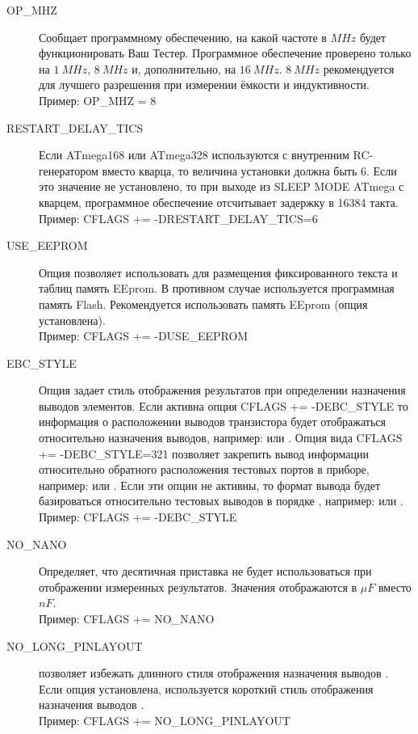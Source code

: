 \begin{description}
  \item[OP\_MHZ] Сообщает программному обеспечению, на какой частоте в \(MHz\) будет функционировать Ваш Тестер. 
Программное обеспечение проверено только на \(1~MHz\), \(8~MHz\) и, дополнительно, на \(16~MHz\). \(8~MHz\) 
рекомендуется для лучшего разрешения при измерении ёмкости и индуктивности.\\
Пример: OP\_MHZ = 8

  \item[RESTART\_DELAY\_TICS] Если ATmega168 или ATmega328 используются с внутренним RC-генератором вместо кварца, 
то величина установки должна быть 6. Если это значение не установлено, то при выходе из SLEEP MODE ATmega с 
кварцем, программное обеспечение отсчитывает задержку в 16384 такта.\\
Пример: CFLAGS += -DRESTART\_DELAY\_TICS=6

  \item[USE\_EEPROM] Опция позволяет использовать для размещения фиксированного текста и таблиц память EEprom. 
В противном случае используется программная память Flash. Рекомендуется использовать память 
EEprom (опция установлена).\\
Пример: CFLAGS += -DUSE\_EEPROM

  \item[EBC\_STYLE] Опция задает стиль отображения результатов при определении назначения выводов элементов. 
Если активна опция CFLAGS += -DEBC\_STYLE то информация о расположении выводов транзистора будет 
отображаться относительно назначения выводов, например:  или . Опция вида 
CFLAGS += -DEBC\_STYLE=321 позволяет закрепить вывод информации относительно обратного расположения 
тестовых портов в приборе, например:  или . Если эти опции не активны, то формат вывода 
будет базироваться относительно тестовых выводов в порядке , например:  или
.\\
Пример: CFLAGS += -DEBC\_STYLE
 
  \item[NO\_NANO] Определяет, что десятичная приставка  не будет использоваться при отображении измеренных 
результатов. Значения отображаются в \(\mu F\) вместо \(nF\).\\
Пример: CFLAGS += NO\_NANO

  \item[NO\_LONG\_PINLAYOUT] позволяет избежать длинного стиля отображения назначения выводов .
  Если опция установлена, используется короткий стиль отображения назначения выводов .\\
Пример: CFLAGS += NO\_LONG\_PINLAYOUT


\end{description}

